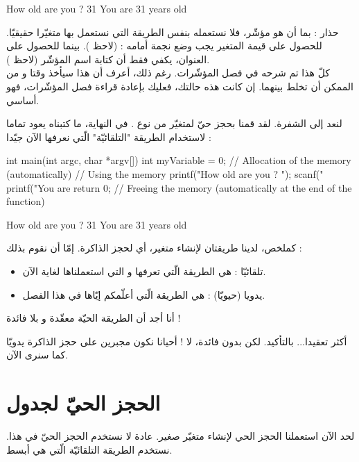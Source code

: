 \begin{Console}
How old are you  ? 31
You are 31 years old
\end{Console}

\begin{warning}
حذار : بما أن
هو مؤشّر، فلا نستعمله بنفس الطريقة التي نستعمل بها متغيّرا حقيقيّا. للحصول على قيمة المتغير يجب وضع نجمة أمامه :
(لاحظ
).
بينما للحصول على العنوان، يكفي فقط أن كتابة اسم المؤشّر
(لاحظ
).\\
كلّ هذا تم شرحه في فصل المؤشّرات. رغم ذلك، أعرف أن هذا سيأخذ وقتا و من الممكن أن تخلط بينهما. إن كانت هذه حالتك، فعليك بإعادة قراءة فصل المؤشّرات، فهو أساسي.
\end{warning}

لنعد إلى الشفرة. لقد قمنا بحجز حيّ لمتغيّر من نوع
.
في النهاية، ما كتبناه يعود تماما لاستخدام الطريقة
"التلقائيّة" الّتي نعرفها الآن جيّدا :

\begin{Csource}
int main(int argc, char *argv[])
{
	int myVariable = 0; // Allocation of the memory (automatically)
  // Using the memory
	printf("How old are you ? ");
	scanf("%
	printf("You are %
	return 0;
} // Freeing the memory (automatically at the end of the function)
\end{Csource}

\begin{Console}
How old are you ? 31
You are 31 years old
\end{Console}

كملخص، لدينا طريقتان لإنشاء متغير، أي لحجز الذاكرة. إمّا أن نقوم بذلك :
\begin{itemize}
  \item تلقائيّا : هي الطريقة الّتي تعرفها و التي استعملناها لغاية الآن.
  \item يدويا (حيويّا) : هي الطريقة الّتي أعلّمكم إيّاها في هذا الفصل.
\end{itemize}

\begin{question}
أنا أجد أن الطريقة الحيّة معقّدة و بلا فائدة !
\end{question}

أكثر تعقيدا... بالتأكيد. لكن بدون فائدة، لا ! أحيانا نكون مجبرين على حجز الذاكرة يدويّا كما سنرى الآن.

\section{الحجز الحيّ لجدول}
لحد الآن استعملنا الحجز الحي لإنشاء متغيّر صغير. عادة لا نستخدم الحجز الحيّ في هذا. نستخدم الطريقة التلقائيّة الّتي هي أبسط.

